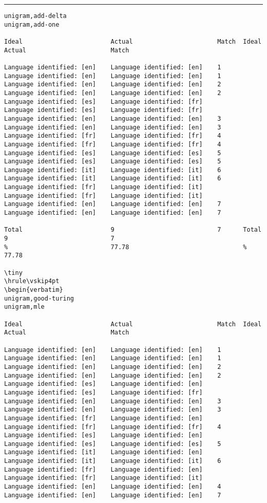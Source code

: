\tiny
\hrule\vskip4pt
\begin{verbatim}
unigram,add-delta                                                unigram,add-one

Ideal                        Actual                       Match  Ideal                        Actual                       Match

Language identified: [en]    Language identified: [en]    1      Language identified: [en]    Language identified: [en]    1
Language identified: [en]    Language identified: [en]    2      Language identified: [en]    Language identified: [en]    2
Language identified: [es]    Language identified: [fr]           Language identified: [es]    Language identified: [fr]
Language identified: [en]    Language identified: [en]    3      Language identified: [en]    Language identified: [en]    3
Language identified: [fr]    Language identified: [fr]    4      Language identified: [fr]    Language identified: [fr]    4
Language identified: [es]    Language identified: [es]    5      Language identified: [es]    Language identified: [es]    5
Language identified: [it]    Language identified: [it]    6      Language identified: [it]    Language identified: [it]    6
Language identified: [fr]    Language identified: [it]           Language identified: [fr]    Language identified: [it]
Language identified: [en]    Language identified: [en]    7      Language identified: [en]    Language identified: [en]    7

Total                        9                            7      Total                        9                            7
%                            77.78                               %                            77.78

\tiny
\hrule\vskip4pt
\begin{verbatim}
unigram,good-turing                                              unigram,mle

Ideal                        Actual                       Match  Ideal                        Actual                       Match

Language identified: [en]    Language identified: [en]    1      Language identified: [en]    Language identified: [en]    1
Language identified: [en]    Language identified: [en]    2      Language identified: [en]    Language identified: [en]    2
Language identified: [es]    Language identified: [en]           Language identified: [es]    Language identified: [fr]
Language identified: [en]    Language identified: [en]    3      Language identified: [en]    Language identified: [en]    3
Language identified: [fr]    Language identified: [en]           Language identified: [fr]    Language identified: [fr]    4
Language identified: [es]    Language identified: [en]           Language identified: [es]    Language identified: [es]    5
Language identified: [it]    Language identified: [en]           Language identified: [it]    Language identified: [it]    6
Language identified: [fr]    Language identified: [en]           Language identified: [fr]    Language identified: [it]
Language identified: [en]    Language identified: [en]    4      Language identified: [en]    Language identified: [en]    7


\end{verbatim}
